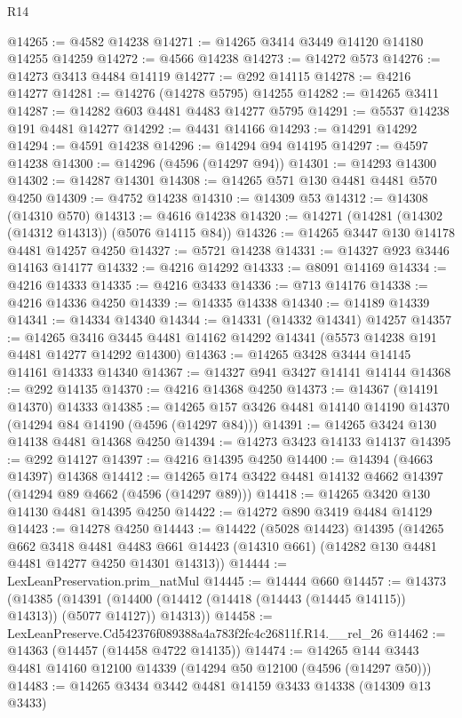 \begin{lexlean}{R14}
\begin{coremodule}
@14265 := @4582 @14238
@14271 := @14265 @3414 @3449 @14120 @14180 @14255 @14259
@14272 := @4566 @14238
@14273 := @14272 @573
@14276 := @14273 @3413 @4484 @14119
@14277 := @292 @14115
@14278 := @4216 @14277
@14281 := @14276 (@14278 @5795) @14255
@14282 := @14265 @3411
@14287 := @14282 @603 @4481 @4483 @14277 @5795
@14291 := @5537 @14238 @191 @4481 @14277
@14292 := @4431 @14166
@14293 := @14291 @14292
@14294 := @4591 @14238
@14296 := @14294 @94 @14195
@14297 := @4597 @14238
@14300 := @14296 (@4596 (@14297 @94))
@14301 := @14293 @14300
@14302 := @14287 @14301
@14308 := @14265 @571 @130 @4481 @4481 @570 @4250
@14309 := @4752 @14238
@14310 := @14309 @53
@14312 := @14308 (@14310 @570)
@14313 := @4616 @14238
@14320 := @14271 (@14281 (@14302 (@14312 @14313)) (@5076 @14115 @84))
@14326 := @14265 @3447 @130 @14178 @4481 @14257 @4250
@14327 := @5721 @14238
@14331 := @14327 @923 @3446 @14163 @14177
@14332 := @4216 @14292
@14333 := @8091 @14169
@14334 := @4216 @14333
@14335 := @4216 @3433
@14336 := @713 @14176
@14338 := @4216 @14336 @4250
@14339 := @14335 @14338
@14340 := @14189 @14339
@14341 := @14334 @14340
@14344 := @14331 (@14332 @14341) @14257
@14357 := @14265
    @3416
    @3445
    @4481
    @14162
    @14292
    @14341
    (@5573 @14238 @191 @4481 @14277 @14292 @14300)
@14363 := @14265 @3428 @3444 @14145 @14161 @14333 @14340
@14367 := @14327 @941 @3427 @14141 @14144
@14368 := @292 @14135
@14370 := @4216 @14368 @4250
@14373 := @14367 (@14191 @14370) @14333
@14385 := @14265 @157 @3426 @4481 @14140 @14190 @14370 (@14294 @84 @14190 (@4596 (@14297 @84)))
@14391 := @14265 @3424 @130 @14138 @4481 @14368 @4250
@14394 := @14273 @3423 @14133 @14137
@14395 := @292 @14127
@14397 := @4216 @14395 @4250
@14400 := @14394 (@4663 @14397) @14368
@14412 := @14265 @174 @3422 @4481 @14132 @4662 @14397 (@14294 @89 @4662 (@4596 (@14297 @89)))
@14418 := @14265 @3420 @130 @14130 @4481 @14395 @4250
@14422 := @14272 @890 @3419 @4484 @14129
@14423 := @14278 @4250
@14443 := @14422
    (@5028 @14423)
    @14395
    (@14265
      @662
      @3418
      @4481
      @4483
      @661
      @14423
      (@14310 @661)
      (@14282 @130 @4481 @4481 @14277 @4250 @14301 @14313))
@14444 := LexLeanPreservation.prim_natMul
@14445 := @14444 @660
@14457 := @14373
    (@14385
      (@14391 (@14400 (@14412 (@14418 (@14443 (@14445 @14115)) @14313)) (@5077 @14127)) @14313))
@14458 := LexLeanPreserve.Cd542376f089388a4a783f2fc4c26811f.R14.__rel_26
@14462 := @14363 (@14457 (@14458 @4722 @14135))
@14474 := @14265 @144 @3443 @4481 @14160 @12100 @14339 (@14294 @50 @12100 (@4596 (@14297 @50)))
@14483 := @14265 @3434 @3442 @4481 @14159 @3433 @14338 (@14309 @13 @3433)

\end{coremodule}
\end{lexlean}
